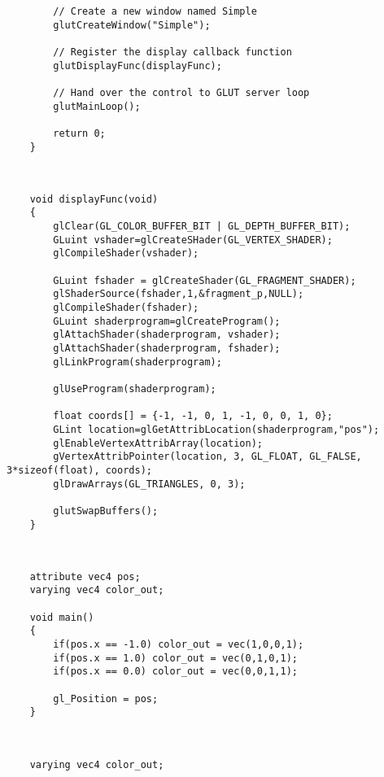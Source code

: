 \begin{compactdesc}
\begin{lstlisting}
		// Create a new window named Simple
		glutCreateWindow("Simple");

		// Register the display callback function
		glutDisplayFunc(displayFunc);

		// Hand over the control to GLUT server loop
		glutMainLoop();

		return 0;
	}
	\end{lstlisting}
\item[\lp{display function}]\hfill\\
	\begin{lstlisting}
	void displayFunc(void)
	{
		glClear(GL_COLOR_BUFFER_BIT | GL_DEPTH_BUFFER_BIT);
		GLuint vshader=glCreateSHader(GL_VERTEX_SHADER);
		glCompileShader(vshader);

		GLuint fshader = glCreateShader(GL_FRAGMENT_SHADER);
		glShaderSource(fshader,1,&fragment_p,NULL);
		glCompileShader(fshader);
		GLuint shaderprogram=glCreateProgram();
		glAttachShader(shaderprogram, vshader);
		glAttachShader(shaderprogram, fshader);
		glLinkProgram(shaderprogram);

		glUseProgram(shaderprogram);

		float coords[] = {-1, -1, 0, 1, -1, 0, 0, 1, 0};
		GLint location=glGetAttribLocation(shaderprogram,"pos");
		glEnableVertexAttribArray(location);
		gVertexAttribPointer(location, 3, GL_FLOAT, GL_FALSE, 3*sizeof(float), coords);
		glDrawArrays(GL_TRIANGLES, 0, 3);

		glutSwapBuffers();
	}
	\end{lstlisting}
\item[\lp{vertex shader}] \hfill\\
	\begin{lstlisting}
	attribute vec4 pos;
	varying vec4 color_out;

	void main()
	{
		if(pos.x == -1.0) color_out = vec(1,0,0,1);
		if(pos.x == 1.0) color_out = vec(0,1,0,1);
		if(pos.x == 0.0) color_out = vec(0,0,1,1);

		gl_Position = pos;
	}
	\end{lstlisting}
\item[\lp{fragment shader}] \hfill\\
	\begin{lstlisting}
	varying vec4 color_out;


\end{lstlisting}
\end{compactdesc}
